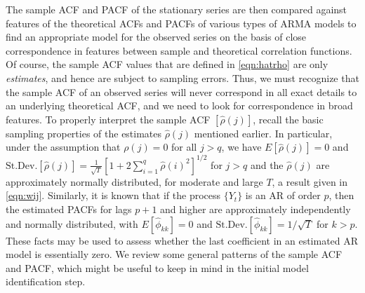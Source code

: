The sample ACF and PACF of the stationary series are then compared against features of the theoretical ACFs and PACFs of various types of ARMA models to find an appropriate model for the observed series on the basis of close correspondence in features between sample and theoretical correlation functions. Of course, the sample ACF values that are defined in \eqref{eqn:hatrho} are only \emph{estimates}, and hence are subject to sampling errors. Thus, we must recognize that the sample ACF of an observed series will never correspond in all exact details to an underlying theoretical ACF, and we need to look for correspondence in broad features. To properly interpret the sample ACF $[\hat{\rho}(j)]$, recall the basic sampling properties of the estimates $\hat{\rho}(j)$ mentioned earlier. In particular, under the assumption that $\rho(j) = 0$ for all $j  > q$, we have $E[\hat{\rho}(j)]= 0$ and $\text{St.Dev.}[\hat{\rho}(j)]= \frac{1}{\sqrt{T}}[1 + 2 \sum_{i=1}^q \hat{\rho}(i)^2]^{1/2}$ for $j > q$ and the $\hat{\rho}(j)$ are approximately normally distributed, for moderate and large $T$, a result given in \eqref{eqn:wij}. Similarly, it is known that if the process $\{Y_t\}$ is an AR of order $p$, then the estimated PACFs for lags $p + 1$ and higher are approximately independently and normally distributed, with $E[\hat{\phi}_{kk}] = 0$ and $\text{St.Dev.}[\hat{\phi}_{kk}] = 1/\sqrt{T}$ for $k > p$. These facts may be used to assess whether the last coefficient in an estimated AR model is essentially zero. We review some general patterns of the sample ACF and PACF, which might be useful to keep in mind in the initial model identification step. 


